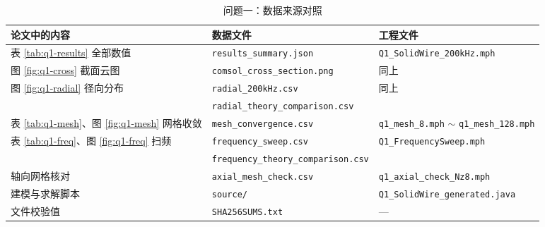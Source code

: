 \documentclass[12pt, a4paper]{ctexart}
\begin{document}
\begin{table}[H]
\centering
\caption{问题一：数据来源对照}
\label{tab:appendix-q1}
\small
\begin{adjustbox}{max width=\textwidth}
\begin{tabular}{l l l}
\toprule
\textbf{论文中的内容} & \textbf{数据文件} & \textbf{工程文件} \\
\midrule
表 \ref{tab:q1-results} 全部数值 & \texttt{results\_summary.json} & \texttt{Q1\_SolidWire\_200kHz.mph} \\
图 \ref{fig:q1-cross} 截面云图 & \texttt{comsol\_cross\_section.png} & 同上 \\
图 \ref{fig:q1-radial} 径向分布 & \texttt{radial\_200kHz.csv} & 同上 \\
 & \texttt{radial\_theory\_comparison.csv} & \\
表 \ref{tab:q1-mesh}、图 \ref{fig:q1-mesh} 网格收敛 & \texttt{mesh\_convergence.csv} & \texttt{q1\_mesh\_8.mph} $\sim$ \texttt{q1\_mesh\_128.mph} \\
表 \ref{tab:q1-freq}、图 \ref{fig:q1-freq} 扫频 & \texttt{frequency\_sweep.csv} & \texttt{Q1\_FrequencySweep.mph} \\
 & \texttt{frequency\_theory\_comparison.csv} & \\
轴向网格核对 & \texttt{axial\_mesh\_check.csv} & \texttt{q1\_axial\_check\_Nz8.mph} \\
建模与求解脚本 & \texttt{source/} & \texttt{Q1\_SolidWire\_generated.java} \\
文件校验值 & \texttt{SHA256SUMS.txt} & --- \\
\bottomrule
\end{tabular}
\end{adjustbox}
\end{table}
\end{document}
